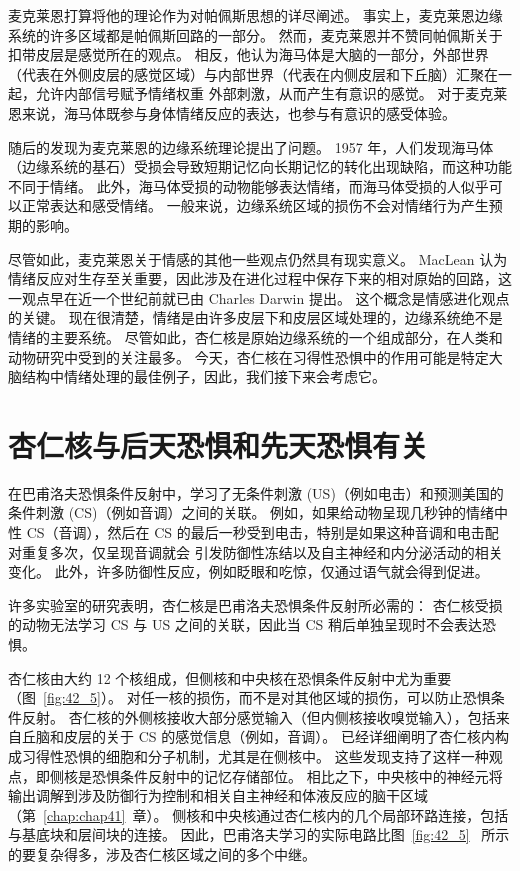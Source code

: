 麦克莱恩打算将他的理论作为对帕佩斯思想的详尽阐述。
事实上，麦克莱恩边缘系统的许多区域都是帕佩斯回路的一部分。
然而，麦克莱恩并不赞同帕佩斯关于扣带皮层是感觉所在的观点。
相反，他认为海马体是大脑的一部分，外部世界（代表在外侧皮层的感觉区域）与内部世界（代表在内侧皮层和下丘脑）汇聚在一起，允许内部信号赋予情绪权重 外部刺激，从而产生有意识的感觉。
对于麦克莱恩来说，海马体既参与身体情绪反应的表达，也参与有意识的感受体验。


随后的发现为麦克莱恩的边缘系统理论提出了问题。 1957 年，人们发现海马体（边缘系统的基石）受损会导致短期记忆向长期记忆的转化出现缺陷，而这种功能不同于情绪。
此外，海马体受损的动物能够表达情绪，而海马体受损的人似乎可以正常表达和感受情绪。
一般来说，边缘系统区域的损伤不会对情绪行为产生预期的影响。


尽管如此，麦克莱恩关于情感的其他一些观点仍然具有现实意义。
MacLean 认为情绪反应对生存至关重要，因此涉及在进化过程中保存下来的相对原始的回路，这一观点早在近一个世纪前就已由 Charles Darwin 提出。
这个概念是情感进化观点的关键。
现在很清楚，情绪是由许多皮层下和皮层区域处理的，边缘系统绝不是情绪的主要系统。
尽管如此，杏仁核是原始边缘系统的一个组成部分，在人类和动物研究中受到的关注最多。
今天，杏仁核在习得性恐惧中的作用可能是特定大脑结构中情绪处理的最佳例子，因此，我们接下来会考虑它。



\section{杏仁核与后天恐惧和先天恐惧有关}

在巴甫洛夫恐惧条件反射中，学习了无条件刺激 (US)（例如电击）和预测美国的条件刺激 (CS)（例如音调）之间的关联。
例如，如果给动物呈现几秒钟的情绪中性 CS（音调），然后在 CS 的最后一秒受到电击，特别是如果这种音调和电击配对重复多次，仅呈现音调就会 引发防御性冻结以及自主神经和内分泌活动的相关变化。
此外，许多防御性反应，例如眨眼和吃惊，仅通过语气就会得到促进。


许多实验室的研究表明，杏仁核是巴甫洛夫恐惧条件反射所必需的：
杏仁核受损的动物无法学习 CS 与 US 之间的关联，因此当 CS 稍后单独呈现时不会表达恐惧。


杏仁核由大约 12 个核组成，但侧核和中央核在恐惧条件反射中尤为重要（图~\ref{fig:42_5}）。
对任一核的损伤，而不是对其他区域的损伤，可以防止恐惧条件反射。
杏仁核的外侧核接收大部分感觉输入（但内侧核接收嗅觉输入），包括来自丘脑和皮层的关于 CS 的感觉信息（例如，音调）。
已经详细阐明了杏仁核内构成习得性恐惧的细胞和分子机制，尤其是在侧核中。
这些发现支持了这样一种观点，即侧核是恐惧条件反射中的记忆存储部位。
相比之下，中央核中的神经元将输出调解到涉及防御行为控制和相关自主神经和体液反应的脑干区域（第~\ref{chap:chap41}~章）。
侧核和中央核通过杏仁核内的几个局部环路连接，包括与基底块和层间块的连接。
因此，巴甫洛夫学习的实际电路比图~\ref{fig:42_5} ~所示的要复杂得多，涉及杏仁核区域之间的多个中继。


